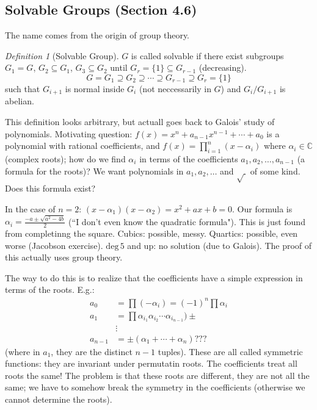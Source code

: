 \documentclass{article}
\theoremstyle{plain}
\theoremstyle{remark}
\newtheorem{definition}{Definition}
\newcommand{\C}{{\mathbb C}}
\begin{document}
\subsection{Solvable Groups (Section 4.6)}
The name comes from the origin of group theory.
\begin{definition}[Solvable Group]
	$G$ is called solvable if there exist subgroups $G_1 = G$,
	$G_2 \subseteq G_1$, $G_3 \subseteq G_2$
	until $G_r = \{1\} \subseteq G_{r-1}$ (decreasing).
	\[
		G = G_1 \supseteq G_2 \supseteq \cdots \supseteq G_{r-1} \supseteq G_r = \{1\}
	\]
	such that $G_{i+1}$ is normal inside $G_i$ (not neccessarily in $G$)
	and $G_i/G_{i+1}$ is abelian.
\end{definition}
This definition looks arbitrary, but actuall goes back to Galois' study of polynomials.
Motivating question: $f(x) = x^n + a_{n-1}x^{n-1} + \cdots + a_0$
is a polynomial with rational coefficients,
and $f(x) = \prod_{i=1}^n(x-\alpha_i)$ where $\alpha_i\in\C$ (complex roots);
how do we find $\alpha_i$ in terms of the coefficients $a_1,a_2,\dots,a_{n-1}$
(a formula for the roots)?
We want polynomials in $a_1,a_2,\dots$ and $\sqrt{~}$ of some kind.
Does this formula exist?

In the case of $n=2$: $(x-\alpha_1)(x-\alpha_2) = x^2 + ax + b = 0$.
Our formula is $\alpha_i = \frac{-a\pm\sqrt{a^2-4b}}{2}$
(``I don't even know the quadratic formula").
This is just found from completinng the square.
Cubics: possible, messy.
Quartics: possible, even worse (Jacobson exercise).
$\mathrm{deg}\,5$ and up: no solution (due to Galois).
The proof of this actually uses group theory.

The way to do this is to realize that the coefficients have a simple
expression in terms of the roots.
E.g.:
\begin{align*}
	a_0 &= \prod(-\alpha_i) = (-1)^n\prod\alpha_i\\
	a_1 &= \prod \alpha_{i_1}\alpha_{i_2}\cdots \alpha_{i_{n-1}})\pm\\
		&\vdots\\
	a_{n-1} &= \pm(\alpha_1 + \cdots + \alpha_n)???
\end{align*}
(where in $a_1$, they are the distinct $n-1$ tuples).
These are all called symmetric functions:
they are invariant under permutatin roots.
The coefficients treat all roots the same!
The problem is that these roots are different, they are not all the same;
we have to somehow break the symmetry in the coefficients
(otherwise we cannot determine the roots).
\end{document}
